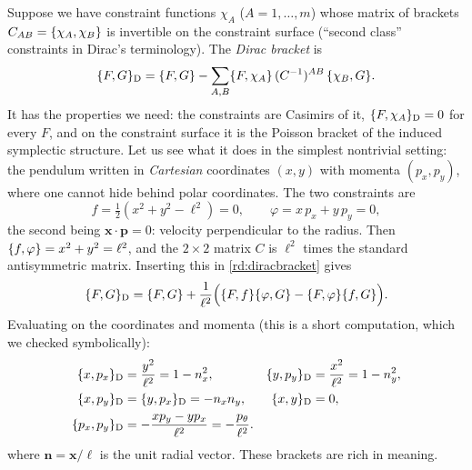 Suppose we have constraint functions $\chi_A$ ($A=1,\dots,m$) whose matrix of brackets $C_{AB}=\{\chi_A,\chi_B\}$ is invertible on the constraint surface (``second class'' constraints in Dirac's terminology). The \emph{Dirac bracket} is
\begin{equation}\label{rd:diracbracket}
\{F,G\}_{\mathrm D}=\{F,G\}-\sum_{A,B}\{F,\chi_A\}\,(C^{-1})^{AB}\,\{\chi_B,G\} .
\end{equation}
It has the properties we need: the constraints are Casimirs of it, $\{F,\chi_A\}_{\mathrm D}=0$ for every $F$, and on the constraint surface it is the Poisson bracket of the induced symplectic structure. Let us see what it does in the simplest nontrivial setting: the pendulum written in \emph{Cartesian} coordinates $(x,y)$ with momenta $(p_x,p_y)$, where one cannot hide behind polar coordinates. The two constraints are
\begin{equation}\label{rd:cartconstraints}
f=\tfrac12(x^2+y^2-\ell^2)=0,\qquad
\varphi=x\,p_x+y\,p_y=0 ,
\end{equation}
the second being $\mathbf x\cdot\mathbf p=0$: velocity perpendicular to the radius. Then $\{f,\varphi\}=x^2+y^2=\ell^2$, and the $2\times2$ matrix $C$ is $\ell^2$ times the standard antisymmetric matrix. Inserting this in \eqref{rd:diracbracket} gives
\begin{equation}\label{rd:cartDB}
\{F,G\}_{\mathrm D}=\{F,G\}+\frac1{\ell^2}\Big(\{F,f\}\{\varphi,G\}-\{F,\varphi\}\{f,G\}\Big).
\end{equation}
Evaluating on the coordinates and momenta (this is a short computation, which we checked symbolically):
\begin{align}
\{x,p_x\}_{\mathrm D}&=\frac{y^2}{\ell^2}=1-n_x^2, &
\{y,p_y\}_{\mathrm D}&=\frac{x^2}{\ell^2}=1-n_y^2, \label{rd:cartDB1}\\
\{x,p_y\}_{\mathrm D}&=\{y,p_x\}_{\mathrm D}=-n_xn_y, &
\{x,y\}_{\mathrm D}&=0, \\
\{p_x,p_y\}_{\mathrm D}&=-\frac{xp_y-yp_x}{\ell^2}=-\frac{p_\theta}{\ell^2}. &&\label{rd:cartDB2}
\end{align}
where $\mathbf n=\mathbf x/\ell$ is the unit radial vector. These brackets are rich in meaning.
